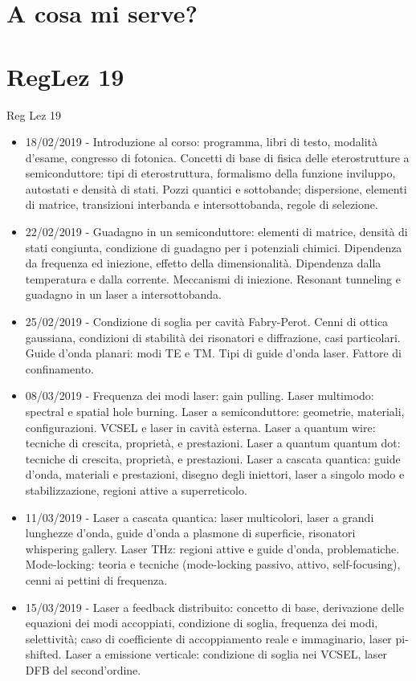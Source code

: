 \section{A cosa mi serve?}

\section{RegLez 19}
\begin{frame}[allowframebreaks]{Reg Lez 19}
\begin{itemize}
 \item 18/02/2019 - Introduzione al corso: programma, libri di testo, modalità d'esame, congresso di fotonica. Concetti di base di fisica delle eterostrutture a semiconduttore: tipi di eterostruttura, formalismo della funzione inviluppo, autostati e densità di stati. Pozzi quantici e sottobande; dispersione, elementi di matrice, transizioni interbanda e intersottobanda, regole di selezione.
\item 22/02/2019 - Guadagno in un semiconduttore: elementi di matrice, densità di stati congiunta, condizione di guadagno per i potenziali chimici. Dipendenza da frequenza ed iniezione, effetto della dimensionalità. Dipendenza dalla temperatura e dalla corrente. Meccanismi di iniezione. Resonant tunneling e guadagno in un laser a intersottobanda.
\item 25/02/2019 - Condizione di soglia per cavità Fabry-Perot. Cenni di ottica gaussiana, condizioni di stabilità dei risonatori e diffrazione, casi particolari. Guide d'onda planari: modi TE e TM. Tipi di guide d'onda laser. Fattore di confinamento.
\item 08/03/2019 - Frequenza dei modi laser: gain pulling. Laser multimodo: spectral e spatial hole burning. Laser a semiconduttore: geometrie, materiali, configurazioni. VCSEL e laser in cavità esterna. Laser a quantum wire: tecniche di crescita, proprietà, e prestazioni. Laser a quantum quantum dot: tecniche di crescita, proprietà, e prestazioni. Laser a cascata quantica: guide d'onda, materiali e prestazioni, disegno degli iniettori, laser a singolo modo e stabilizzazione, regioni attive a superreticolo.
\item 11/03/2019 - Laser a cascata quantica: laser multicolori, laser a grandi lunghezze d'onda, guide d'onda a plasmone di superficie, risonatori whispering gallery. Laser THz: regioni attive e guide d'onda, problematiche. Mode-locking: teoria e tecniche (mode-locking passivo, attivo, self-focusing), cenni ai pettini di frequenza.
\item 15/03/2019 - Laser a feedback distribuito: concetto di base, derivazione delle equazioni dei modi accoppiati, condizione di soglia, frequenza dei modi, selettività; caso di coefficiente di accoppiamento reale e immaginario, laser pi-shifted. Laser a emissione verticale: condizione di soglia nei VCSEL, laser DFB del second'ordine.

\end{itemize}
\end{frame}
